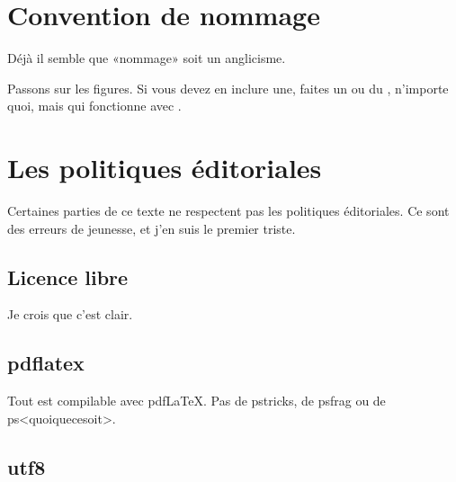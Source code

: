 \section{Convention de nommage}

Déjà il semble que «nommage» soit un anglicisme.

Passons sur les figures. Si vous devez en inclure une, faites un  ou du , n'importe quoi, mais qui fonctionne avec .

\section{Les politiques éditoriales}

Certaines parties de ce texte ne respectent pas les politiques éditoriales. Ce sont des erreurs de jeunesse, et j'en suis le premier triste.

\subsection{Licence libre}

Je crois que c'est clair.

\subsection{pdflatex}

Tout est compilable avec pdf\LaTeX. Pas de pstricks, de psfrag ou de ps<quoiquecesoit>.

\subsection{utf8}

